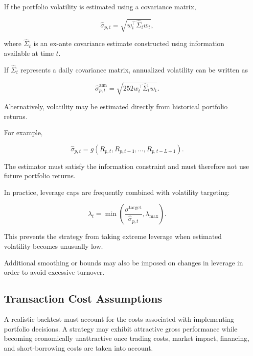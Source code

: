 \documentclass[11pt,a4paper]{article}
\begin{document}
If the portfolio volatility is estimated using a covariance matrix,

\begin{equation}
\widehat{\sigma}_{p,t}
=
\sqrt{
w_t^\top
\widehat{\Sigma}_t
w_t
},
\end{equation}

where $\widehat{\Sigma}_t$ is an ex-ante covariance estimate constructed using
information available at time $t$.

If $\widehat{\Sigma}_t$ represents a daily covariance matrix, annualized
volatility can be written as

\begin{equation}
\widehat{\sigma}_{p,t}^{\mathrm{ann}}
=
\sqrt{
252
w_t^\top
\widehat{\Sigma}_t
w_t
}.
\end{equation}

Alternatively, volatility may be estimated directly from historical portfolio
returns.

For example,

\begin{equation}
\widehat{\sigma}_{p,t}
=
g
\left(
R_{p,t},
R_{p,t-1},
\ldots,
R_{p,t-L+1}
\right).
\end{equation}

The estimator must satisfy the information constraint and must therefore not
use future portfolio returns.

In practice, leverage caps are frequently combined with volatility targeting:

\begin{equation}
\boxed{
\lambda_t
=
\min
\left(
\frac{
\sigma^{\mathrm{target}}
}{
\widehat{\sigma}_{p,t}
},
\lambda_{\max}
\right).
}
\end{equation}

This prevents the strategy from taking extreme leverage when estimated
volatility becomes unusually low.

Additional smoothing or bounds may also be imposed on changes in leverage in
order to avoid excessive turnover.


\subsection{Transaction Cost Assumptions}
\label{subsec:transaction_costs}

A realistic backtest must account for the costs associated with implementing
portfolio decisions. A strategy may exhibit attractive gross performance while
becoming economically unattractive once trading costs, market impact, financing,
and short-borrowing costs are taken into account.
\end{document}
